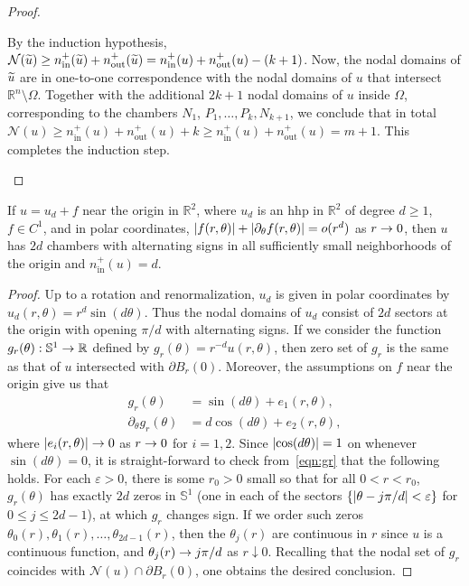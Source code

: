 \documentclass[AHL,Unicode,longabstracts,published]{cedram}
\newcommand{\R}{\mathbb{R}}
\newcommand{\sphere}{\mathbb{S}}
\newcommand{\ra}{\to}
\newcommand{\da}{\downarrow}
\newcommand{\abs}[1]{\left \lvert #1 \right \rvert}
\newcommand{\nin}{n^+_{\mathrm{in}}}
\newcommand{\nout}{n^+_{\mathrm{out}}}
\newcommand{\nodal}{\mathcal{N}}
\renewcommand{\epsilon}{\varepsilon}
\let\oldtilde\tilde
\renewcommand*{\tilde}[1]{\mathchoice{\widetilde{#1}}{\widetilde{#1}}{\oldtilde{#1}}{\oldtilde{#1}}}
\renewcommand*{\to}{\mathchoice{\longrightarrow}{\rightarrow}{\rightarrow}{\rightarrow}}
\let\originalleft\left
\let\originalright\right
\renewcommand{\left}{\mathopen{}\mathclose\bgroup\originalleft}
\renewcommand{\right}{\aftergroup\egroup\originalright}
\newcommand{\R}{\mathbb{R}}
\begin{document}
\begin{proof}
\begin{itemize}
By the induction hypothesis, $\nodal(\tilde u)\geq \nin(\tilde u)+\nout(\tilde u)=\nin(u)+\nout(u)-(k+1)$. Now, the nodal domains of $\tilde u$ are in one-to-one correspondence with the nodal domains of $u$ that intersect $\R^n\setminus\Omega$. Together with the additional $2k+1$ nodal domains of $u$ inside $\Omega$, corresponding to the chambers $N_1$, \linebreak$P_1, \dots, P_k, N_{k+1}$, we conclude that in total $\nodal(u)\geq \nin(u)+\nout(u)+k\geq \nin(u)+\nout(u)=m+1$. This completes the induction step.\qedhere
\end{itemize}
\end{proof}

\begin{lemm}\label{l:alternate}
If $u=u_d+f$ near the origin in $\R^2$, where $u_d$ is an hhp in $\R^2$ of degree $d\geq 1$, $f\in C^1$, and in polar coordinates, $|f(r,\theta)| + \abs{\partial_\theta f(r,\theta)} =o(r^d)$ as $r \ra 0$, then $u$ has $2d$ chambers with alternating signs in all sufficiently small neighborhoods of the origin and $\nin(u)=d$.
\end{lemm}

\begin{proof}
Up to a rotation and renormalization, $u_d$ is given in polar coordinates by $u_d(r,\theta) = r^d \sin (d\theta)$. Thus the nodal domains of $u_d$ consist of $2d$ sectors at the origin with opening $\pi/d$ with alternating signs. If we consider the function $g_r(\theta): \sphere^1 \ra \R$ defined by $g_r(\theta) = r^{-d} u(r,\theta)$, then zero set of $g_r$ is the same as that of $u$ intersected with $\partial B_r(0)$. Moreover, the assumptions on $f$ near the origin give us that
\begin{equation}\label{eqn:gr}
\begin{split}
g_r(\theta) &= \sin(d\theta) + e_1(r,\theta), \\
\partial_\theta g_r(\theta) &= d \cos(d\theta) + e_2(r,\theta),
\end{split}
\end{equation}
where $\abs{e_i (r,\theta)} \ra 0$ as $r \ra 0$ for $i=1,2$. Since $\abs{\cos(d\theta)} =1$ on whenever $\sin(d\theta)=0$, it is straight-forward to check from~\eqref{eqn:gr} that the following holds. For each $\epsilon >0$, there is some $r_0 >0$ small so that for all $0 < r < r_0$, $g_r(\theta)$ has exactly $2d$ zeros in $\sphere^1$ (one in each of the sectors $\{\abs{\theta - j\pi/d} < \epsilon\}$ for $0 \le j \le 2d-1$), at which $g_r$ changes sign. If we order such zeros $\theta_0(r), \theta_1(r), \dots, \theta_{2d-1}(r)$, then the $\theta_j(r)$ are continuous in $r$ since $u$ is a continuous function, and $\theta_j(r) \ra j\pi/d$ as $r \da 0$. Recalling that the nodal set of $g_r$ coincides with $\nodal(u) \cap \partial B_r(0)$, one obtains the desired conclusion.
\end{proof}
\end{document}
